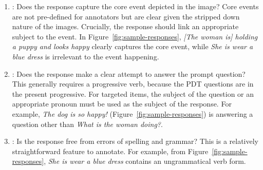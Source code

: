 \begin{enumerate}
\item \textbf{}: Does the response capture the core event depicted in the image? Core events are not pre-defined for annotators but are clear given the stripped down nature of the images. Crucially, the response should link an appropriate subject to the event.  In Figure~\ref{fig:sample-responses}, \textit{[The woman is] holding a puppy and looks happy} clearly captures the core event, while \textit{She is wear a blue dress} is irrelevant to the event happening.
\item \textbf{}: Does the response make a clear attempt to answer the prompt question? This generally requires a progressive verb, because the PDT questions are in the present progressive. For targeted items, the subject of the question or an appropriate pronoun must be used as the subject of the response.  For example, \textit{The dog is so happy!} (Figure~\ref{fig:sample-responses}) is answering a question other than \textit{What is the woman doing?}. 
\item \textbf{}: Is the response free from errors of spelling and grammar?  
This is a relatively straightforward feature to annotate. For example, from Figure~\ref{fig:sample-responses}, \textit{She is wear a blue dress} contains an ungrammatical verb form.


\end{enumerate}
